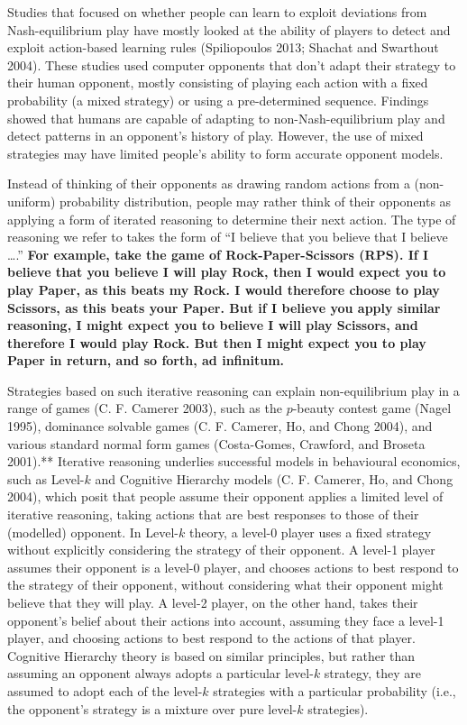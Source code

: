 \documentclass[smallextended]{svjour3}       %
\begin{document}
Studies that focused on whether people can learn to exploit deviations
from Nash-equilibrium play have mostly looked at the ability of players
to detect and exploit action-based learning rules (Spiliopoulos 2013;
Shachat and Swarthout 2004). These studies used computer opponents that
don't adapt their strategy to their human opponent, mostly consisting of
playing each action with a fixed probability (a mixed strategy) or using
a pre-determined sequence. Findings showed that humans are capable of
adapting to non-Nash-equilibrium play and detect patterns in an
opponent's history of play. However, the use of mixed strategies may
have limited people's ability to form accurate opponent models.

Instead of thinking of their opponents as drawing random actions from a
(non-uniform) probability distribution, people may rather think of their
opponents as applying a form of iterated reasoning to determine their
next action. The type of reasoning we refer to takes the form of ``I
believe that you believe that I believe \ldots{}.'' \textbf{For example,
take the game of Rock-Paper-Scissors (RPS). If I believe that you
believe I will play Rock, then I would expect you to play Paper, as this
beats my Rock. I would therefore choose to play Scissors, as this beats
your Paper. But if I believe you apply similar reasoning, I might expect
you to believe I will play Scissors, and therefore I would play Rock.
But then I might expect you to play Paper in return, and so forth, ad
infinitum.}

Strategies based on such iterative reasoning can explain non-equilibrium
play in a range of games (C. F. Camerer 2003), such as the \(p\)-beauty
contest game (Nagel 1995), dominance solvable games (C. F. Camerer, Ho,
and Chong 2004), and various standard normal form games (Costa-Gomes,
Crawford, and Broseta 2001).** Iterative reasoning underlies successful
models in behavioural economics, such as Level-\(k\) and Cognitive
Hierarchy models (C. F. Camerer, Ho, and Chong 2004), which posit that
people assume their opponent applies a limited level of iterative
reasoning, taking actions that are best responses to those of their
(modelled) opponent. In Level-\(k\) theory, a level-0 player uses a
fixed strategy without explicitly considering the strategy of their
opponent. A level-1 player assumes their opponent is a level-0 player,
and chooses actions to best respond to the strategy of their opponent,
without considering what their opponent might believe that they will
play. A level-2 player, on the other hand, takes their opponent's belief
about their actions into account, assuming they face a level-1 player,
and choosing actions to best respond to the actions of that player.
Cognitive Hierarchy theory is based on similar principles, but rather
than assuming an opponent always adopts a particular level-\(k\)
strategy, they are assumed to adopt each of the level-\(k\) strategies
with a particular probability (i.e., the opponent's strategy is a
mixture over pure level-\(k\) strategies).
\end{document}

